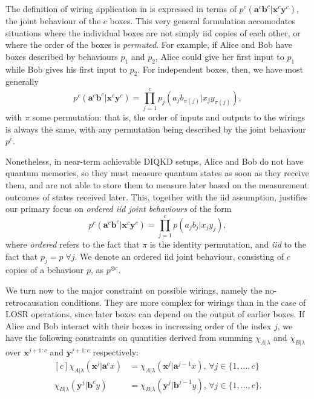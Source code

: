 \documentclass[10pt, a4paper]{article}
\numberwithin{equation}{section} %
\theoremstyle{definition}
\theoremstyle{plain}
\newcommand{\dintv}[2]{\mathopen\{#1,\ldots,#2\mathclose\}}
\newcommand{\?}{\mathrel{?}} %
\newcommand{\cvec}[1]{\boldsymbol{\mathbf{#1}}}    %
\begin{document}
              The definition of wiring application in  is expressed in terms of \(p^c(\cvec{a}^c\cvec{b}^c|\cvec{x}^c\cvec{y}^c)\), the joint behaviour of the \(c\) boxes. This very general formulation accomodates situations where the individual boxes are not simply iid copies of each other, or where the order of the boxes is \emph{permuted}. For example, if Alice and Bob have boxes described by behaviours \(p_1\) and \(p_2\), Alice could give her first input to \(p_1\) while Bob gives his first input to \(p_2\). For independent boxes, then, we have most generally
              \begin{equation}
                p^c(\cvec{a}^c\cvec{b}^c|\cvec{x}^c\cvec{y}^c) = \prod_{j=1}^c p_j(a_jb_{\pi(j)}|x_jy_{\pi(j)}),
              \end{equation}
              with \(\pi\) some permutation: that is, the order of inputs and outputs to the wirings is always the same, with any permutation being described by the joint behaviour \(p^c\).

              Nonetheless, in near-term achievable DIQKD setups, Alice and Bob do not have quantum memories, so they must measure quantum states as soon as they receive them, and are not able to store them to measure later based on the measurement outcomes of states received later. This, together with the iid assumption, justifies our primary focus on \emph{ordered iid joint behaviours} of the form
              \begin{equation}
                p^c(\cvec{a}^c\cvec{b}^c|\cvec{x}^c\cvec{y}^c) = \prod_{j=1}^c p(a_jb_j|x_jy_j),
              \end{equation}
              where \emph{ordered} refers to the fact that \(\pi\) is the identity permutation, and \emph{iid} to the fact that \(p_j = p\;\forall j\). We denote an ordered iid joint behaviour, consisting of \(c\) copies of a behaviour \(p\), as \(p^{\otimes c}\).

              We turn now to the major constraint on possible wirings, namely the no-retrocausation conditions. They are more complex for wirings than in the case of LOSR operations, since later boxes can depend on the output of earlier boxes. If Alice and Bob interact with their boxes in increasing order of the index \(j\), we have the following constraints on quantities derived from summing \(\chi_{A|\lambda}\) and \(\chi_{B|\lambda}\) over \(\cvec{x}^{j+1:c}\) and \(\cvec{y}^{j+1:c}\) respectively:
              \begin{equation}
                \begin{aligned}[c]
                  \chi_{A|\lambda}(\cvec{x}^j|\cvec{a}^cx) &= \chi_{A|\lambda}(\cvec{x}^j|\cvec{a}^{j-1}x),\,\forall j \in \dintv{1}{c} \\
                  \chi_{B|\lambda}(\cvec{y}^j|\cvec{b}^cy) &= \chi_{B|\lambda}(\cvec{y}^j|\cvec{b}^{j-1}y),\,\forall j \in \dintv{1}{c}.
                \end{aligned}\label{eqn:wiringnoretro}
              \end{equation}
\end{document}
